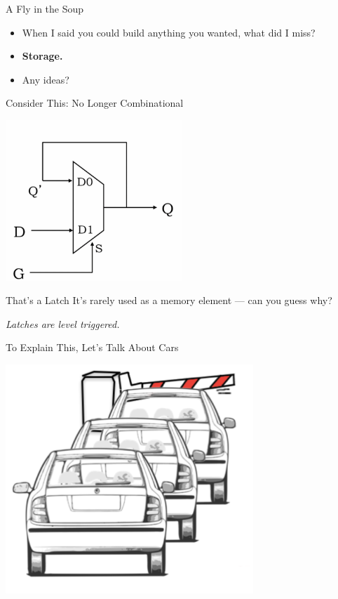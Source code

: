 \documentclass[aspectratio=169, 11pt, handout]{beamer}
\begin{document}
\begin{frame}{A Fly in the Soup}
    \begin{itemize}
        \item When I said you could build anything you wanted, what did I miss?\pause
        \item \textbf{Storage.}\pause
        \item Any ideas?
    \end{itemize}
\end{frame}


\begin{frame}{Consider This: No Longer Combinational}
    \begin{center}
        \includegraphics[width=0.5\textwidth]{Screen Shot 2022-09-25 at 00.14.12.png}
    \end{center}
\end{frame}

\begin{frame}{That's a Latch}
    It's rarely used as a memory element --- can you guess why?\\\pause
    
    \emph{Latches are level triggered.}
    
\end{frame}

\begin{frame}{To Explain This, Let's Talk About Cars}
\pause

\begin{center}
    \includegraphics[width=0.7\textwidth]{latch_cars.png}
\end{center}
\end{frame}
\end{document}

